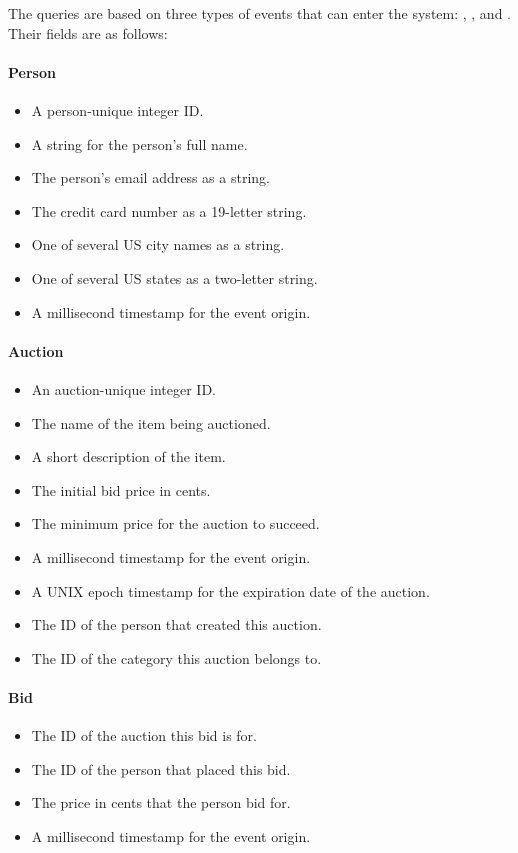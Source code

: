 The queries are based on three types of events that can enter the system: , , and . Their fields are as follows:

\paragraph*{Person}
\begin{itemize}
\item {} A person-unique integer ID.
\item {} A string for the person's full name.
\item {} The person's email address as a string.
\item {} The credit card number as a 19-letter string.
\item {} One of several US city names as a string.
\item {} One of several US states as a two-letter string.
\item {} A millisecond timestamp for the event origin.
\end{itemize}

\paragraph*{Auction}
\begin{itemize}
\item {} An auction-unique integer ID.
\item {} The name of the item being auctioned.
\item {} A short description of the item.
\item {} The initial bid price in cents.
\item {} The minimum price for the auction to succeed.
\item {} A millisecond timestamp for the event origin.
\item {} A UNIX epoch timestamp for the expiration date of the auction.
\item {} The ID of the person that created this auction.
\item {} The ID of the category this auction belongs to.
\end{itemize}

\paragraph*{Bid}
\begin{itemize}
\item {} The ID of the auction this bid is for.
\item {} The ID of the person that placed this bid.
\item {} The price in cents that the person bid for.
\item {} A millisecond timestamp for the event origin.
\end{itemize}

